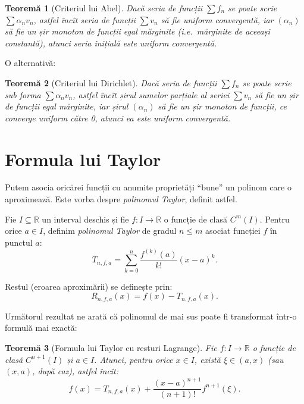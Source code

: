\documentclass[11pt,a4paper]{article}
\newcommand\qq{\enquote}
\newcommand\seq{\subseteq}
\newcommand\RR{\mathbb{R}}
\theoremstyle{dotless}
\newtheorem{theorem}{Teorem\u{a}}[section]
\theoremstyle{dotlessdr}
\begin{document}
\begin{theorem}[Criteriul lui Abel]\label{thm:abel-serii-f}
  Dacă seria de funcții $\sum f_n$ se poate scrie $\sum \alpha_n v_n$, astfel încît
  seria de funcții $\sum v_n$ să fie uniform convergentă, iar $(\alpha_n)$ să fie un
  șir monoton de funcții egal mărginite (i.e.\ mărginite de aceeași constantă),
  atunci seria inițială este uniform convergentă.
\end{theorem}

O alternativă:

\begin{theorem}[Criteriul lui Dirichlet]\label{thm:dirichlet-serii-f}
  Dacă seria de funcții $\sum f_n$ se poate scrie sub forma $\sum \alpha_n v_n$,
  astfel încît șirul sumelor parțiale al seriei $\sum v_n$ să fie un șir de funcții
  egal mărginite, iar șirul $(\alpha_n)$ să fie un șir monoton de funcții, ce converge
  uniform către 0, atunci ea este uniform convergentă.
\end{theorem}


\section{Formula lui Taylor}
\label{sec:taylor}

Putem asocia oricărei funcții cu anumite proprietăți \qq{bune} un polinom care o
aproximează. Este vorba despre \emph{polinomul Taylor}, definit astfel.

Fie $I \seq \RR$ un interval deschis și fie $f : I \to \RR$ o funcție de clasă
$C^m(I)$. Pentru orice $a \in I$, definim \emph{polinomul Taylor} de gradul $n \leq m$
asociat funcției $f$ în punctul $a$:
\[
  T_{n, f, a} = \sum_{k = 0}^n \frac{f^{(k)}(a)}{k!} (x - a)^k.
\]

Restul (eroarea aproximării) se definește prin:
\[
  R_{n, f, a}(x) = f(x) - T_{n, f, a} (x).
\]

Următorul rezultat ne arată că polinomul de mai sus poate fi transformat într-o formulă
mai exactă:

\begin{theorem}[Formula lui Taylor cu resturi Lagrange]\label{thm:taylor-lagrange}
  Fie $f : I \to \RR$ o funcție de clasă $C^{n+1}(I)$ și $a \in I$. Atunci, pentru
  orice $x \in I$, există $\xi \in (a, x)$ (sau $(x, a)$, după caz), astfel încît:
  \[
    f(x) = T_{n, f, a}(x) + \frac{(x - a)^{n+1}}{(n + 1)!} f^{n + 1}(\xi).
  \]
\end{theorem}
\end{document}

